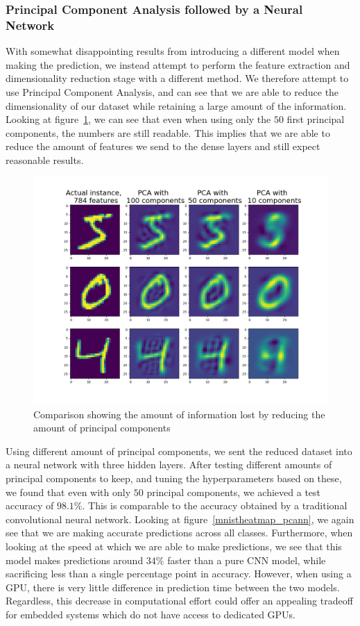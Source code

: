 \documentclass[onecolumn,10pt,cleanfoot]{asme2ej}
\begin{document}
\subsubsection{Principal Component Analysis followed by a Neural Network}

With somewhat disappointing results from introducing a different model when making the prediction, we instead attempt to perform the feature extraction and dimensionality reduction stage with a different method. We therefore attempt to use Principal Component Analysis, and can see that we are able to reduce the dimensionality of our dataset while retaining a large amount of the information. Looking at figure~\ref{pcacomp}, we can see that even when using only the $50$ first principal components, the numbers are still readable. This implies that we are able to reduce the amount of features we send to the dense layers and still expect reasonable results.

\begin{figure}[H]
\centerline{\includegraphics[width=5in]{figure/pcacomp.png}}
\caption{Comparison showing the amount of information lost by reducing the amount of principal components}
\label{pcacomp}
\end{figure}

Using different amount of principal components, we sent the reduced dataset into a neural network with three hidden layers. After testing different amounts of principal components to keep, and tuning the hyperparameters based on these, we found that even with only $50$ principal components, we achieved a test accuracy of $98.1\%$. This is comparable to the accuracy obtained by a traditional convolutional neural network. Looking at figure~\ref{mnistheatmap_pcann}, we again see that we are making accurate predictions across all classes. Furthermore, when looking at the speed at which we are able to make predictions, we see that this model makes predictions around $34\%$ faster than a pure CNN model, while sacrificing less than a single percentage point in accuracy. However, when using a GPU, there is very little difference in prediction time between the two models. Regardless, this decrease in computational effort could offer an appealing tradeoff for embedded systems which do not have access to dedicated GPUs.
\end{document}
